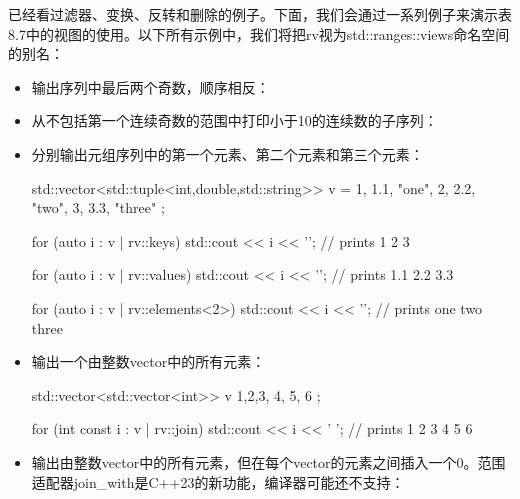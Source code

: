 已经看过滤器、变换、反转和删除的例子。下面，我们会通过一系列例子来演示表8.7中的视图的使用。以下所有示例中，我们将把rv视为std::ranges::views命名空间的别名：

\begin{itemize}
\item
输出序列中最后两个奇数，顺序相反：


\item
从不包括第一个连续奇数的范围中打印小于10的连续数的子序列：


\item
分别输出元组序列中的第一个元素、第二个元素和第三个元素：

\begin{cpp}
std::vector<std::tuple<int,double,std::string>> v =
{
	{1, 1.1, "one"},
	{2, 2.2, "two"},
	{3, 3.3, "three"}
};

for (auto i : v | rv::keys)
	std::cout << i << '\n'; // prints 1 2 3
	
for (auto i : v | rv::values)
	std::cout << i << '\n'; // prints 1.1 2.2 3.3
	
for (auto i : v | rv::elements<2>)
	std::cout << i << '\n'; // prints one two three
\end{cpp}

\item
输出一个由整数vector中的所有元素：

\begin{cpp}
std::vector<std::vector<int>> v {
	{1,2,3}, {4}, {5, 6}
};

for (int const i : v | rv::join)
	std::cout << i << ' '; // prints 1 2 3 4 5 6
\end{cpp}

\item
输出由整数vector中的所有元素，但在每个vector的元素之间插入一个0。范围适配器join\_with是C++23的新功能，编译器可能还不支持：


\end{itemize}
